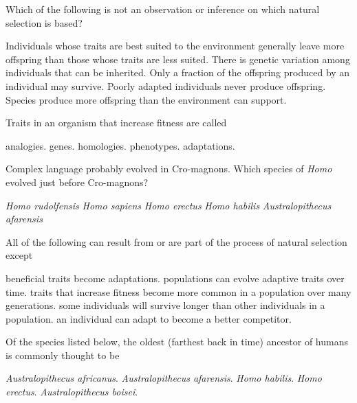 \question
Which of the following is not an observation or inference on which natural selection is based?

\begin{choices}
\choice Individuals whose traits are best suited to the environment generally leave more offspring than those whose traits are less suited.
\choice There is genetic variation among individuals that can be inherited.
\choice Only a fraction of the offspring produced by an individual may survive.
\correctchoice Poorly adapted individuals never produce offspring.
\choice Species produce more offspring than the environment can support.
\end{choices}

\newpage

\question
Traits in an organism that increase fitness are called

\begin{choices}
\choice analogies.
\choice genes.
\choice homologies.
\choice phenotypes.
\correctchoice adaptations.
\end{choices}

\question
Complex language probably evolved in Cro-magnons. Which species of \textit{Homo} evolved just before Cro-magnons?

\begin{choices}
\choice \textit{Homo rudolfensis} 
\choice \textit{Homo sapiens} 
\correctchoice \textit{Homo erectus} 
\choice \textit{Homo habilis} 
\choice \textit{Australopithecus afarensis} 
\end{choices}

\question
All of the following can result from or are part of the process of natural selection except

\begin{choices}
\choice beneficial traits become adaptations.
\choice populations can evolve adaptive traits over time.
\choice traits that increase fitness become more common in a population over many generations.
\choice some individuals will survive longer than other individuals in a population.
\correctchoice an individual can adapt to become a better competitor.
\end{choices}

\question
Of the species listed below, the oldest (farthest back in time) ancestor of humans is commonly thought to be

\begin{choices}
\choice \textit{Australopithecus africanus}.
\correctchoice \textit{Australopithecus afarensis}.
\choice \textit{Homo habilis}.
\choice \textit{Homo erectus}.
\choice \textit{Australopithecus boisei}.
\end{choices}

